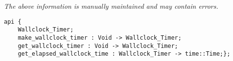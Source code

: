 \label{api:Wallclock\_Timer}

{\tiny \it The above information is manually maintained and may contain errors.}
\begin{verbatim}
api {
    Wallclock_Timer;
    make_wallclock_timer : Void -> Wallclock_Timer;
    get_wallclock_timer : Void -> Wallclock_Timer;
    get_elapsed_wallclock_time : Wallclock_Timer -> time::Time;};
\end{verbatim}
